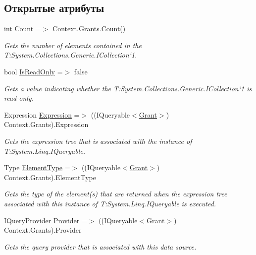 \subsection*{Открытые атрибуты}
\begin{DoxyCompactItemize}
\item 
int \hyperlink{class_security_1_1_entity_framework_1_1_collections_1_1_grant_collection_afd4afe16b57405f81ff84ee7aeb92021}{Count} =$>$ Context.\+Grants.\+Count()
\begin{DoxyCompactList}\small\item\em Gets the number of elements contained in the T\+:\+System.\+Collections.\+Generic.\+I\+Collection`1. \end{DoxyCompactList}\item 
bool \hyperlink{class_security_1_1_entity_framework_1_1_collections_1_1_grant_collection_af456c4626259b99e823d1ec4c17359a5}{Is\+Read\+Only} =$>$ false
\begin{DoxyCompactList}\small\item\em Gets a value indicating whether the T\+:\+System.\+Collections.\+Generic.\+I\+Collection`1 is read-\/only. \end{DoxyCompactList}\item 
Expression \hyperlink{class_security_1_1_entity_framework_1_1_collections_1_1_grant_collection_aa08b5ab575562a16149a4a2ffef6dbbd}{Expression} =$>$ ((I\+Queryable$<$\hyperlink{class_security_1_1_model_1_1_grant}{Grant}$>$) Context.\+Grants).Expression
\begin{DoxyCompactList}\small\item\em Gets the expression tree that is associated with the instance of T\+:\+System.\+Linq.\+I\+Queryable. \end{DoxyCompactList}\item 
Type \hyperlink{class_security_1_1_entity_framework_1_1_collections_1_1_grant_collection_ae55be1ee2addfb47c9571f51331afaa4}{Element\+Type} =$>$ ((I\+Queryable$<$\hyperlink{class_security_1_1_model_1_1_grant}{Grant}$>$) Context.\+Grants).Element\+Type
\begin{DoxyCompactList}\small\item\em Gets the type of the element(s) that are returned when the expression tree associated with this instance of T\+:\+System.\+Linq.\+I\+Queryable is executed. \end{DoxyCompactList}\item 
I\+Query\+Provider \hyperlink{class_security_1_1_entity_framework_1_1_collections_1_1_grant_collection_a65cbd1cfdc8df59f288fec61a9637942}{Provider} =$>$ ((I\+Queryable$<$\hyperlink{class_security_1_1_model_1_1_grant}{Grant}$>$) Context.\+Grants).Provider
\begin{DoxyCompactList}\small\item\em Gets the query provider that is associated with this data source. \end{DoxyCompactList}\end{DoxyCompactItemize}
